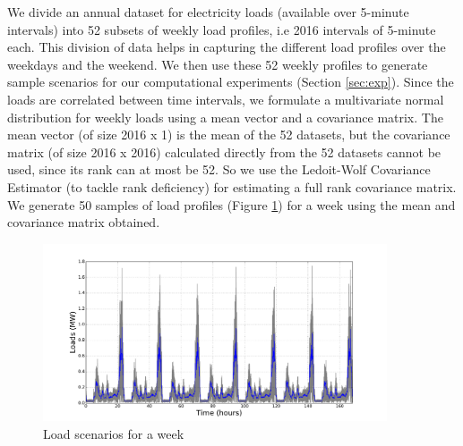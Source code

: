 \documentclass[11pt,twoside]{article}
\begin{document}
We divide an annual dataset for electricity loads (available over 5-minute intervals) into 52 subsets of weekly load profiles, i.e 2016 intervals of 5-minute each. This division of data helps in capturing the different load profiles over the weekdays and the weekend. We then use these 52 weekly profiles to generate sample scenarios for our computational experiments (Section \ref{sec:exp}). Since the loads are correlated between time intervals, we formulate a multivariate normal distribution for weekly loads using a mean vector and a covariance matrix. The mean vector (of size 2016 x 1) is the mean of the 52 datasets, but the covariance matrix (of size 2016 x 2016) calculated directly from the 52 datasets cannot be used, since its rank can at most be 52. So we use the Ledoit-Wolf Covariance Estimator \cite{ledoit2004well} (to tackle rank deficiency) for estimating a full rank covariance matrix. We generate 50 samples of load profiles (Figure \ref{fig:loads_scenarios}) for a week using the mean and covariance matrix obtained. 
\begin{figure}[h!]
\begin{center}
\includegraphics[width=4in]{Figures/Plots/fullproblem_stoch/loads_scenarios.pdf} \caption{Load scenarios for a week}\label{fig:loads_scenarios}\end{center}
\end{figure}
\end{document}
